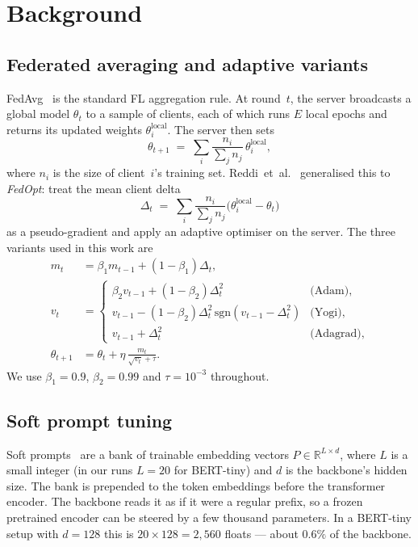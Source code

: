 \documentclass[journal]{IEEEtran}
\begin{document}
\section{Background}
\label{sec:background}

\subsection{Federated averaging and adaptive variants}
FedAvg~\cite{mcmahan2017} is the standard FL aggregation rule. At round~$t$,
the server broadcasts a global model $\theta_t$ to a sample of clients, each
of which runs $E$ local epochs and returns its updated weights
$\theta_i^{\text{local}}$. The server then sets
\[
\theta_{t+1} \;=\; \sum_i \frac{n_i}{\sum_j n_j}\,\theta_i^{\text{local}},
\]
where $n_i$ is the size of client~$i$'s training set. Reddi~et~al.\
\cite{reddi2021} generalised this to \emph{FedOpt}: treat the mean client
delta
\[
\Delta_t \;=\; \sum_i \frac{n_i}{\sum_j n_j}\bigl(\theta_i^{\text{local}} - \theta_t\bigr)
\]
as a pseudo-gradient and apply an adaptive optimiser on the server. The
three variants used in this work are
\begin{align*}
m_t &= \beta_1 m_{t-1} + (1-\beta_1)\Delta_t,\\
v_t &= \begin{cases}
\beta_2 v_{t-1} + (1-\beta_2)\Delta_t^2 & \text{(Adam),}\\
v_{t-1} - (1-\beta_2)\Delta_t^2\,\mathrm{sgn}(v_{t-1}{-}\Delta_t^2) & \text{(Yogi),}\\
v_{t-1} + \Delta_t^2 & \text{(Adagrad),}
\end{cases}\\
\theta_{t+1} &= \theta_t + \eta\,\frac{m_t}{\sqrt{v_t}+\tau}.
\end{align*}
We use $\beta_1 = 0.9$, $\beta_2 = 0.99$ and $\tau = 10^{-3}$ throughout.

\subsection{Soft prompt tuning}
Soft prompts~\cite{lester2021} are a bank of trainable embedding vectors
$P \in \mathbb{R}^{L \times d}$, where $L$ is a small integer (in our runs
$L=20$ for BERT-tiny) and $d$ is the backbone's hidden size. The bank is
prepended to the token embeddings before the transformer encoder. The
backbone reads it as if it were a regular prefix, so a frozen pretrained
encoder can be steered by a few thousand parameters. In a BERT-tiny setup
with $d=128$ this is $20 \times 128 = 2{,}560$ floats --- about $0.6\%$ of
the backbone.
\end{document}
